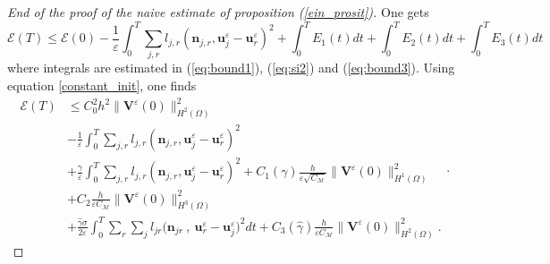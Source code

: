 \documentclass[a4paper,french,english,10pt]{article}
\newcommand\ljr{l_{jr}}
\newcommand\njr{\mathbf{n}_{jr}}
\newcommand\eps{\varepsilon}
\begin{document}
\begin{proof}[End of the proof of the naive estimate of  proposition (\ref{ein_prosit})]
One gets
$$
\mathscr{E}(T) \leq \mathscr{E}(0)
-\frac1\eps \int_0^T \sum_{j,r}l_{j,r}(\textbf{n}_{j,r},\textbf{u}_j^{\eps}-\textbf{u}
_r^{\eps})^2 +
\int_0^T E_1(t)dt + \int_0^T E_2(t)dt
+\int_0^T E_3(t)dt
$$
where integrals are estimated in 
(\ref{eq:bound1}), (\ref{eq:si2}) and   
(\ref{eq:bound3}).  Using equation \eqref{constant_init}, one finds
\begin{equation*}
\begin{aligned}
\mathscr{E}(T)& \leq C_0^2h^2 \| \mathbf{V}^{\eps}(0) \|_{H^2(\Omega)}^2 \\
& 
-\frac1\eps \int_0^T \sum_{j,r}l_{j,r}(\textbf{n}_{j,r},\textbf{u}_j^{\eps}-\textbf{u}
_r^{\eps})^2\\
&  +  \frac{\gamma}{\eps}
     \int_0^T \sum_{j,r}l_{j,r}(\textbf{n}_{j,r},\textbf{u}_j^{\eps}-\textbf{u}
_r^{\eps})^2 
+
C_1(\gamma) \frac h { \varepsilon \sqrt{C_\mathcal M} }   \| \mathbf{V}^{\eps}(0) \|_{H^1(\Omega)}^2
\\
& + %
C_2 \frac{h}{\varepsilon C_\mathcal M}
 \|  \mathbf V ^\eps(0) \|^2_  { H^3(\Omega)  } \\
&
+ \frac{\widehat{\gamma} \sigma}{2\eps}\int_0^T\sum_r \sum_j \ljr \bigg( 
\njr  \: , \: \textbf{u}_r^{\eps}-\textbf{u}_j^{\eps} \bigg)^2 dt 
+ C_3(\widehat \gamma) \frac{h}{ \varepsilon C_\mathcal M}
 \|  \mathbf{V}^{\eps}(0) \|_{H^2(\Omega)}^2.
 \end{aligned}.
\end{equation*}

\end{proof}
\end{document}
